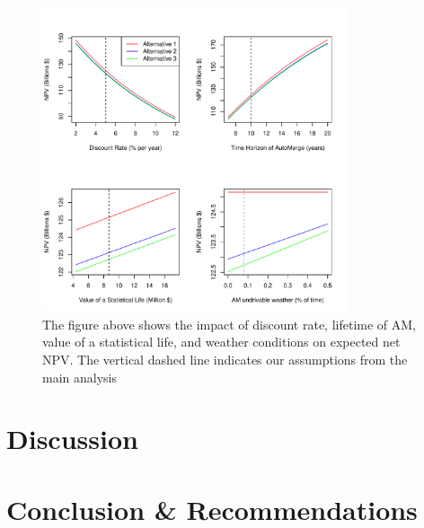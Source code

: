 \documentclass[11pt, letterpaper]{article}
\begin{document}
\begin{figure}[H]
\centering
\includegraphics[width=0.8\textwidth]{../../R/sensitivity.pdf}
\caption{The figure above shows the impact of discount rate, lifetime
  of AM, value of a statistical life, and weather conditions on
  expected net NPV.  The vertical dashed line indicates our
  assumptions from the main analysis}
\label{fig:sensitivity}
\end{figure}

\section{Discussion} \label{discussion}


\section{Conclusion \& Recommendations} \label{conclusion}


\begin{multicols}{2}
\printbibliography[heading=none]
\end{multicols}
\end{document}
